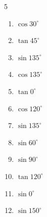 \begin{multicols}{5}
\begin{enumerate}

  \item $\displaystyle \cos{30^\circ}$


  \item $\displaystyle \tan{45^\circ}$

        \phantom{$\displaystyle =1$}

\columnbreak %

  \item $\displaystyle \sin{135^\circ}$


  \item $\displaystyle \cos{135^\circ}$


  \item $\displaystyle \tan{0^\circ}$

        \phantom{$\displaystyle =0$}

  \item $\displaystyle \cos{120^\circ}$


  \item $\displaystyle \sin{135^\circ}$


  \item $\displaystyle \sin{60^\circ}$


  \item $\displaystyle \sin{90^\circ}$

        \phantom{$\displaystyle =1$}

  \item $\displaystyle \tan{120^\circ}$


  \item $\displaystyle \sin{0^\circ}$

        \phantom{$\displaystyle =0$}

  \item $\displaystyle \sin{150^\circ}$



\end{enumerate}
\end{multicols}
